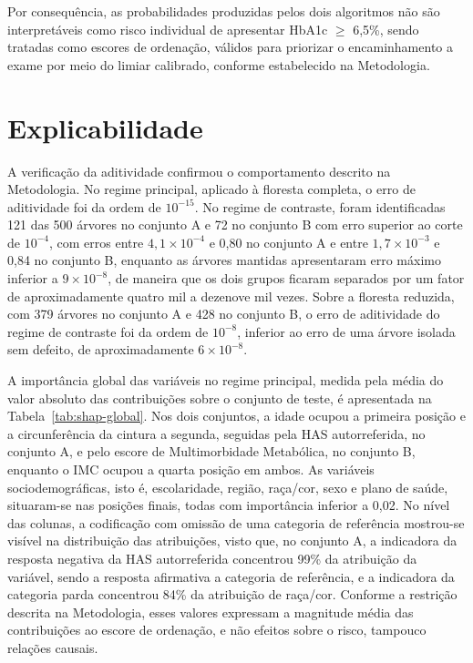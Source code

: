 Por consequência, as probabilidades produzidas pelos dois algoritmos não são interpretáveis como risco individual de apresentar HbA1c $\geq$ 6,5\%, sendo tratadas como escores de ordenação, válidos para priorizar o encaminhamento a exame por meio do limiar calibrado, conforme estabelecido na Metodologia.

\section{Explicabilidade}\label{sec:res-explicabilidade}
A verificação da aditividade confirmou o comportamento descrito na Metodologia. No regime principal, aplicado à floresta completa, o erro de aditividade foi da ordem de $10^{-15}$. No regime de contraste, foram identificadas 121 das 500 árvores no conjunto A e 72 no conjunto B com erro superior ao corte de $10^{-4}$, com erros entre $4{,}1 \times 10^{-4}$ e 0,80 no conjunto A e entre $1{,}7 \times 10^{-3}$ e 0,84 no conjunto B, enquanto as árvores mantidas apresentaram erro máximo inferior a $9 \times 10^{-8}$, de maneira que os dois grupos ficaram separados por um fator de aproximadamente quatro mil a dezenove mil vezes. Sobre a floresta reduzida, com 379 árvores no conjunto A e 428 no conjunto B, o erro de aditividade do regime de contraste foi da ordem de $10^{-8}$, inferior ao erro de uma árvore isolada sem defeito, de aproximadamente $6 \times 10^{-8}$.

A importância global das variáveis no regime principal, medida pela média do valor absoluto das contribuições sobre o conjunto de teste, é apresentada na Tabela~\ref{tab:shap-global}. Nos dois conjuntos, a idade ocupou a primeira posição e a circunferência da cintura a segunda, seguidas pela HAS autorreferida, no conjunto A, e pelo escore de Multimorbidade Metabólica, no conjunto B, enquanto o IMC ocupou a quarta posição em ambos. As variáveis sociodemográficas, isto é, escolaridade, região, raça/cor, sexo e plano de saúde, situaram-se nas posições finais, todas com importância inferior a 0,02. No nível das colunas, a codificação com omissão de uma categoria de referência mostrou-se visível na distribuição das atribuições, visto que, no conjunto A, a indicadora da resposta negativa da HAS autorreferida concentrou 99\% da atribuição da variável, sendo a resposta afirmativa a categoria de referência, e a indicadora da categoria parda concentrou 84\% da atribuição de raça/cor. Conforme a restrição descrita na Metodologia, esses valores expressam a magnitude média das contribuições ao escore de ordenação, e não efeitos sobre o risco, tampouco relações causais.


